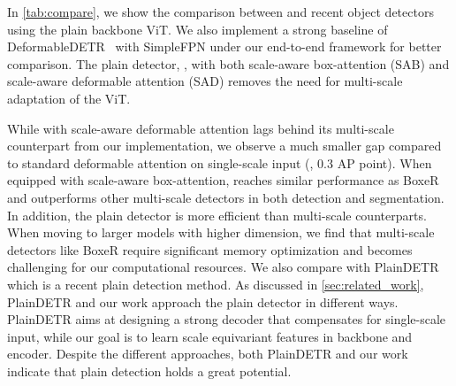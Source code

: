  In \cref{tab:compare}, we show the comparison between \ours and recent object detectors using the plain backbone ViT. We also implement a strong baseline of DeformableDETR~\cite{zhu2021deformable} with SimpleFPN under our end-to-end framework for better comparison. The plain detector, \ours, with both scale-aware box-attention (SAB) and scale-aware deformable attention (SAD) removes the need for multi-scale adaptation of the ViT.

While \ours with scale-aware deformable attention lags behind its multi-scale counterpart from our implementation, we observe a much smaller gap compared to standard deformable attention on single-scale input (\eg, 0.3  AP point). When equipped with scale-aware box-attention, \ours reaches similar performance as BoxeR and outperforms other multi-scale detectors in both detection and segmentation. In addition, the plain detector is more efficient than multi-scale counterparts. When moving to larger models with higher dimension, we find that multi-scale detectors like BoxeR require significant memory optimization and becomes challenging for our computational resources. We also compare with PlainDETR~\cite{lin2023plaindetr} which is a recent plain detection method. As discussed in \cref{sec:related_work}, PlainDETR and our work approach the plain detector in different ways. PlainDETR aims at designing a strong decoder that compensates for single-scale input, while our goal is to learn scale equivariant features in backbone and encoder. Despite the different approaches, both PlainDETR and our work indicate that plain detection holds a great potential.




